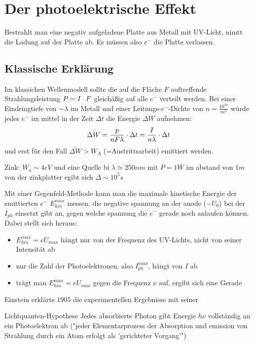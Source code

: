 \section{Der photoelektrische Effekt} %
\label{sec:Der_photoelektrische_Effekt}
Bestrahlt man eine negativ aufgeladene Platte aus Metall mit UV-Licht, nimtt
die Ladung auf der Platte ab. Es müssen also $e^-$ die Platte verlassen.
\subsection{Klassische Erklärung} %
\label{sub:Klassische_Erklärung}
Im klassichen Wellenmodell sollte die auf die Fläche $F$ auftreffende
Strahlungsleistung $P=I\cdot F$ gleichäßig auf alle $e^-$ verteilt werden. Bei
einer Eindringtiefe von $\sim \lambda$ im Metall und einer
Leitungs-$e^-$-Dichte von $n=\frac{10^{19}}{m^3}$ würde jedes $e^-$ im mittel
in der Zeit $\Delta t$ die Energie $\bar{\Delta W}$ aufnehmen:
\begin{equation*}
    \bar{\Delta W} = \frac{p}{n F \lambda} \cdot \Delta t 
    =
    \frac{I}{n \lambda} \cdot \Delta t
\end{equation*}
und erst für den Fall $\bar{\Delta W} > W_A$ (=Austrittsarbeit) emittiert
werden.
\begin{beis}
    Zink: $W_a \sim 4eV$ und eine Quelle bi $\lambda \simeq 250nm$ mit $P=1W$
    im abstand von $1m$ von der zinkplatter egibt sich $\Delta \sim 10^5 s$ 
\end{beis}
Mit einer Gegenfeld-Methode kann man die maximale kinetische Energie der
emittierten $e^-$ $E_{kin}^{max}$ messen. die negative spannung an der anode
($-U_0$) bei der $I_{ph}$ einsetzt gibt an, gegen welche spannung die $e^-$
gerade noch anlaufen können. Dabei stellt sich heraus:
\begin{itemize}
    \item $E_{kin}^{max} = e U_{max}$ hängt nur von der Frequenz des UV-Lichts,
    nicht von seiner Intensität ab
    \item nur die Zahl der Photoelektronen, also $I_{ph}^{max}$, hängt von $I$
    ab
    \item
    trägt man $E_{kin}^{max}=e U_{max}$ gegen die Frequenz $\nu$ auf, ergibt
    sich eine Gerade
\end{itemize}
Einstein erklärte $1905$ die experimentellen Ergebnisse mit seiner
\begin{erl}{Lichtquanten-Hypothese}
    Jedes absorbierte Photon gibt Energie $h\nu$ vollständig an ein
    Photoelektron ab ("jeder Elementarprozess der Absorption und emission von
    Strahlung durch ein Atom erfolgt als 'gerichteter Vorgang'")
\end{erl}
